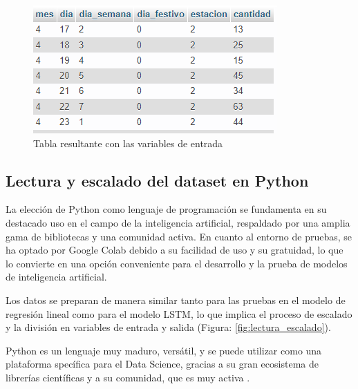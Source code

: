 \begin{figure}[H]
  \begin{center}
    \includegraphics[scale=0.90]{./tabla_resultante.png}
    \caption{Tabla resultante con las variables de entrada}
    \label{fig:tabla_resultante}
  \end{center}
\end{figure}


\subsection{Lectura y escalado del dataset en Python}

La elección de Python como lenguaje de programación se fundamenta en su destacado uso en el campo de la inteligencia artificial, respaldado por una amplia gama de bibliotecas y una comunidad activa\cite{mirjalili2020python}. En cuanto al entorno de pruebas, se ha optado por Google Colab debido a su facilidad de uso y su gratuidad, lo que lo convierte en una opción conveniente para el desarrollo y la prueba de modelos de inteligencia artificial.

\vspace{1\baselineskip}
Los datos se preparan de manera similar tanto para las pruebas en el modelo de regresión lineal como para el modelo LSTM, lo que implica el proceso de escalado y la división en variables de entrada y salida (Figura: \ref{fig:lectura_escalado}).


\vspace{1\baselineskip}
Python es un lenguaje muy maduro, versátil, y se puede utilizar como una plataforma specífica para el Data Science, gracias a su gran ecosistema de librerías científicas y a su comunidad, que es muy activa \cite{chilet2023elaboracion}.

